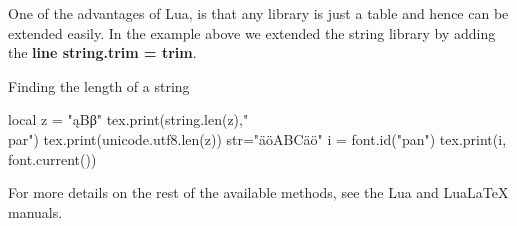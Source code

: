 One of the advantages of Lua, is that any library is just a table and hence can be extended easily. In the example above we extended the string library by adding the \textbf{line string.trim = trim}.  




\begin{texexample}{Finding the length  of a string}{}
\begin{luacode*}
local z = "ąΒβ"
tex.print(string.len(z),"\\par")
tex.print(unicode.utf8.len(z))
str="äöABCäö"
 i = font.id("pan")
 tex.print(i, font.current())
\end{luacode*}
\end{texexample}

For more details on the rest of the available methods, see the Lua and LuaLaTeX manuals.
